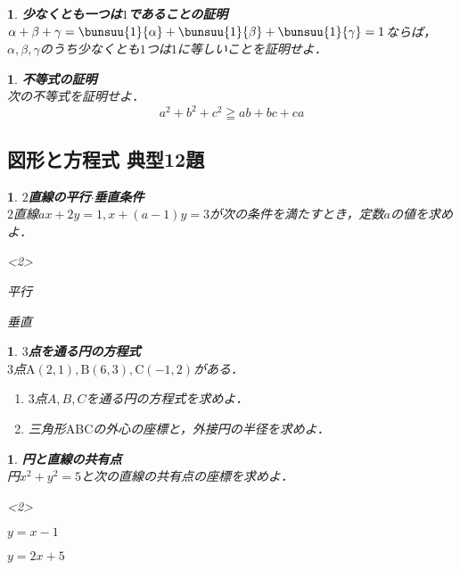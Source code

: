 \documentclass[10pt,
fleqn,
dvipdfmx,
uplatex
]{jsarticle}
\newtheorem{question}[Question]{}
\begin{document}
\begin{question}{\bf\boldmath 少なくとも一つは$1$であることの証明}\\
$\alpha +\beta +\gamma=\bunsuu{1}{\alpha }+\bunsuu{1}{\beta }+\bunsuu{1}{\gamma}=1$ならば，$\alpha , \beta , \gamma$のうち少なくとも$1$つは$1$に等しいことを証明せよ．
\end{question}



\begin{question}{\bf\boldmath 不等式の証明}\\
次の不等式を証明せよ．
\[a^2+b^2+c^2\geqq ab+bc+ca\]
\end{question}

\subsection{図形と方程式 典型12題}



\begin{question}{\bf\boldmath $2$直線の平行$\cdot$垂直条件}\\
$2$直線$ax+2y=1, x+\left(a-1\right)y=3$が次の条件を満たすとき，定数$a$の値を求めよ．
\begin{edaenumerate}<2>
\item 平行
\item 垂直
\end{edaenumerate}

\end{question}



\begin{question}{\bf\boldmath $3$点を通る円の方程式}\\
$3$点$\text{A}\left(2,1\right), \text{B}\left(6,3\right), \text{C}\left(-1,2\right)$がある．
\begin{enumerate}
\item $3$点$A,B,C$を通る円の方程式を求めよ．
\item 三角形$\text{ABC}$の外心の座標と，外接円の半径を求めよ．
\end{enumerate}

\end{question}



\begin{question}{\bf\boldmath 円と直線の共有点}\\
円$x^2+y^2=5$と次の直線の共有点の座標を求めよ．
\begin{edaenumerate}<2>
\item $y=x-1$
\item $y=2x+5$
\end{edaenumerate}

\end{question}
\end{document}
